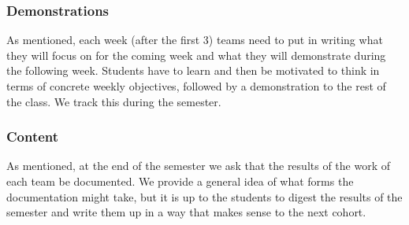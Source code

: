 \subsubsection{Demonstrations}
As mentioned, each week (after the first 3) teams need to put in writing what they will focus on for the coming week and what they will demonstrate during the following week. Students have to learn and then be motivated to think in terms of concrete weekly objectives, followed by a demonstration to the rest of the class. We track this during the semester.

\subsubsection{Content}As mentioned, at the end of the semester we ask that the results of the work of each team be documented. We provide a general idea of what forms the documentation might take, but it is up to the students to digest the results of the semester and write them up in a way that makes sense to the next cohort.

